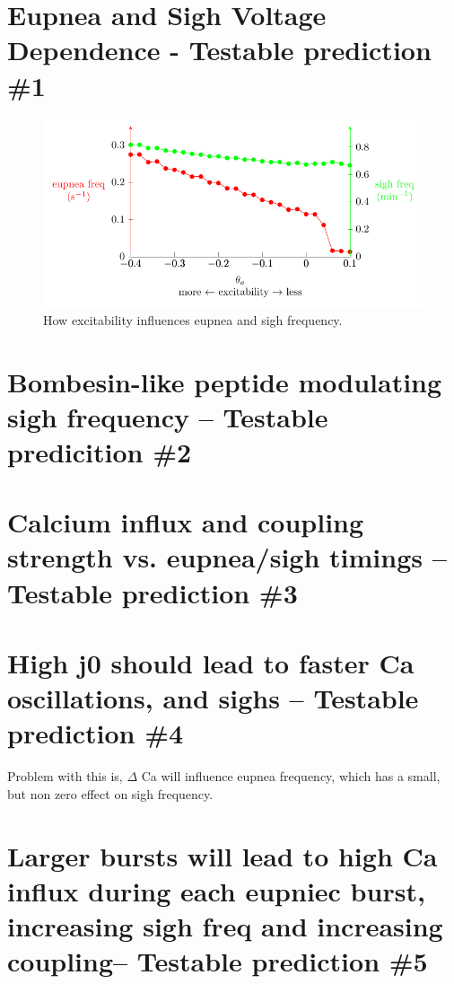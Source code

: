 \documentclass[12pt]{article}
\begin{document}
\clearpage
\section*{Eupnea and Sigh Voltage Dependence - Testable prediction \#1}


\begin{figure}[h!]
\centering
\includegraphics[width=\textwidth]{Fig05EupneaAndSighFrequency}
\caption{How excitability influences   eupnea and sigh frequency.   }
\label{EupneaAndSighFrequency}
\end{figure}

\section*{Bombesin-like peptide modulating sigh frequency -- Testable predicition \#2}

\section*{Calcium influx and coupling strength vs. eupnea/sigh timings -- Testable prediction \#3}

\section*{High j0 should lead to faster Ca oscillations, and sighs -- Testable prediction \#4}

Problem with this is, $\Delta$ Ca will influence eupnea frequency, which has a small, but non zero effect on sigh frequency.

\section*{Larger bursts will lead to high Ca influx during each eupniec burst, increasing sigh freq and increasing coupling-- Testable prediction \#5}
\end{document}
